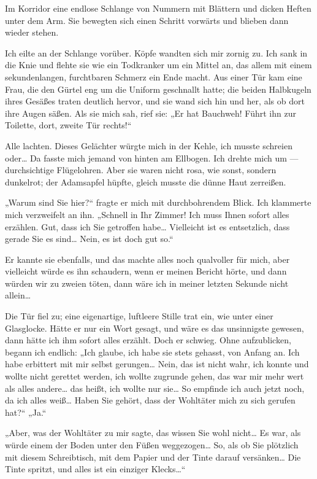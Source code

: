 Im Korridor eine endlose Schlange von Nummern mit Blättern und
dicken Heften unter dem Arm. Sie bewegten sich einen Schritt
vorwärts und blieben dann wieder stehen.

Ich eilte an der Schlange vorüber. Köpfe wandten sich mir zornig
zu. Ich sank in die Knie und flehte sie wie ein Todkranker um ein
Mittel an, das allem mit einem sekundenlangen, furchtbaren Schmerz
ein Ende macht. Aus einer Tür kam eine Frau, die den Gürtel eng um
die Uniform geschnallt hatte; die beiden Halbkugeln ihres Gesäßes
traten deutlich hervor, und sie wand sich hin und her, als ob dort
ihre Augen säßen. Als sie mich sah, rief sie: „Er hat Bauchweh!
Führt ihn zur Toilette, dort, zweite Tür rechts!“

Alle lachten. Dieses Gelächter würgte mich in der Kehle, ich musste
schreien oder\ldots{} Da fasste mich jemand von hinten am Ellbogen. Ich
drehte mich um — durchsichtige Flügelohren. Aber sie waren nicht
rosa, wie sonst, sondern dunkelrot; der Adamsapfel hüpfte, gleich
musste die dünne Haut zerreißen.

„Warum sind Sie hier?“ fragte er mich mit durchbohrendem Blick. Ich
klammerte mich verzweifelt an ihn. „Schnell in Ihr Zimmer! Ich muss
Ihnen sofort alles erzählen. Gut, dass ich Sie getroffen habe\ldots{}
Vielleicht ist es entsetzlich, dass gerade Sie es sind\ldots{} Nein, es
ist doch gut so.“

Er kannte sie ebenfalls, und das machte alles noch qualvoller für
mich, aber vielleicht würde es ihn schaudern, wenn er meinen
Bericht hörte, und dann würden wir zu zweien töten, dann wäre ich
in meiner letzten Sekunde nicht allein\ldots{}

Die Tür fiel zu; eine eigenartige, luftleere Stille trat ein, wie
unter einer Glasglocke. Hätte er nur ein Wort gesagt, und wäre es
das unsinnigste gewesen, dann hätte ich ihm sofort alles erzählt.
Doch er schwieg. Ohne aufzublicken, begann ich endlich: „Ich
glaube, ich habe sie stets gehasst, von Anfang an. Ich habe
erbittert mit mir selbst gerungen\ldots{} Nein, das ist nicht wahr, ich
konnte und wollte nicht gerettet werden, ich wollte zugrunde gehen,
das war mir mehr wert als alles andere\ldots{} das heißt, ich wollte nur
sie\ldots{} So empfinde ich auch jetzt noch, da ich alles weiß\ldots{} Haben
Sie
gehört, dass der Wohltäter mich zu sich gerufen hat?“ „Ja.“

„Aber, was der Wohltäter zu mir sagte, das wissen Sie wohl nicht\ldots{}
Es war, als würde einem der Boden unter den Füßen weggezogen\ldots{} So,
als ob Sie plötzlich mit diesem Schreibtisch, mit dem Papier und
der Tinte darauf versänken\ldots{} Die Tinte spritzt, und alles ist ein
einziger Klecks\ldots{}“

